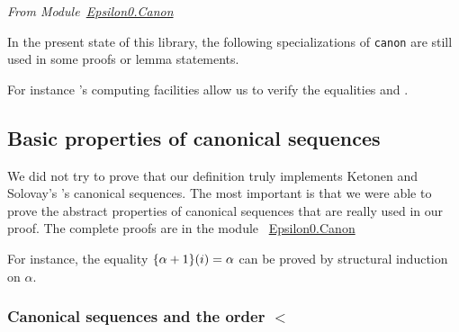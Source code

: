 \vspace{4pt}
\emph{From Module~\href{../theories/html/hydras.Epsilon0.Canon.html\#canon}{Epsilon0.Canon}}

\label{Functions:canonS}
\label{Functions:canon}



In the present state of this library, the following specializations of \texttt{canon} are still used in some proofs or lemma statements. 





For instance \coq's computing facilities allow us to verify the equalities\linebreak 
{} and
.







\subsection{Basic properties of canonical sequences}

We did not  try to prove that our definition truly implements Ketonen and Solovay's  \cite{KS81}'s canonical sequences. The most important is that we were able to prove the 
abstract properties  of canonical sequences that are really used in our proof. The complete proofs are in the module
~\href{../theories/html/hydras.Epsilon0.Canon.html}{Epsilon0.Canon}

For instance, the equality $\mbox{$\{\alpha+1\}(i)$}=\alpha$  can be  proved by  structural induction on $\alpha$.




\subsubsection{Canonical sequences and the order $<$}

